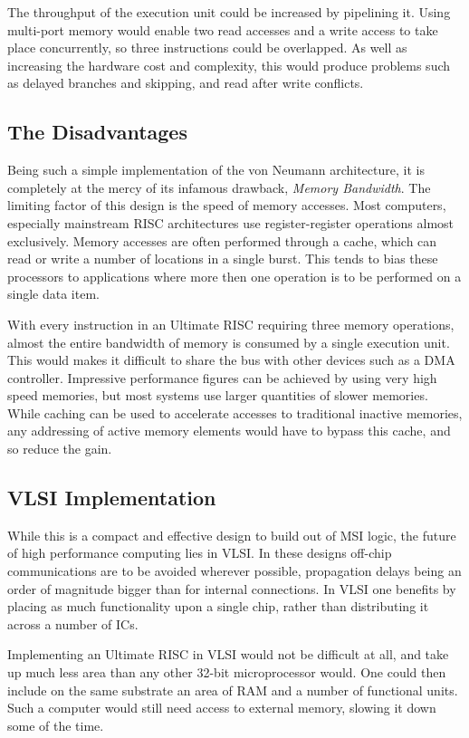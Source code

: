 The throughput of the execution unit could be increased by pipelining it. 
Using multi-port memory would enable two read accesses and a write access to take place concurrently, so three instructions could be overlapped.
 As well as increasing the hardware cost and complexity, this would produce problems such as delayed branches and skipping, and read after write conflicts. 

\subsection{The Disadvantages}

Being such a simple implementation of the von Neumann architecture, it is completely at the mercy of its infamous drawback, {\em Memory Bandwidth}.
The limiting factor of this design is the speed of memory accesses.
Most computers, especially mainstream RISC architectures use register-register operations almost exclusively. 
Memory accesses are often performed through a cache, which can read or write a number of locations in a single burst.
This tends to bias these processors to applications where more then one operation is to be performed on a single data item.

With every instruction in an Ultimate RISC requiring three memory operations, almost the entire bandwidth of memory is consumed by a single execution unit.
This would makes it difficult to share the bus with other devices such as a DMA controller. 
Impressive performance figures can be achieved by using very high speed memories, but most systems use larger quantities of slower memories.
While caching can be used to accelerate accesses to traditional inactive memories, any addressing of active memory elements would have to bypass this cache, and so
reduce the gain.


\subsection{VLSI Implementation}

While this is a compact and effective design to build out of MSI logic, the future of high performance computing  lies in VLSI. 
In these designs off-chip communications are to be avoided wherever possible, propagation  delays being an order of magnitude bigger than for internal connections.
 In VLSI one benefits by placing as much functionality upon a single chip, rather than distributing it across a number of ICs.

Implementing an Ultimate RISC in VLSI would not be difficult at all, and take up much less area than any other 32-bit microprocessor would. One could then include on the same substrate an area of RAM and a number of functional units.
Such a computer would still need access to external memory, slowing it down some of the time.

